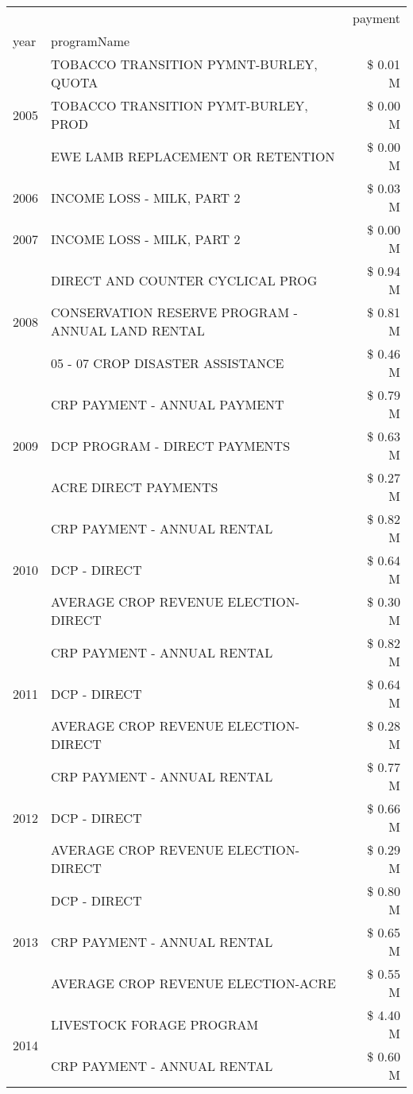 \begin{tabular}{llr}
\toprule
 &  & payment \\
year & programName &  \\
\midrule
\multirow[t]{3}{*}{2005} & TOBACCO TRANSITION PYMNT-BURLEY, QUOTA & \$ 0.01 M \\
 & TOBACCO TRANSITION PYMT-BURLEY, PROD & \$ 0.00 M \\
 & EWE LAMB REPLACEMENT OR RETENTION & \$ 0.00 M \\
\cline{1-3}
2006 & INCOME LOSS - MILK, PART 2 & \$ 0.03 M \\
\cline{1-3}
2007 & INCOME LOSS - MILK, PART 2 & \$ 0.00 M \\
\cline{1-3}
\multirow[t]{3}{*}{2008} & DIRECT AND COUNTER CYCLICAL PROG & \$ 0.94 M \\
 & CONSERVATION RESERVE PROGRAM - ANNUAL LAND RENTAL & \$ 0.81 M \\
 & 05 - 07 CROP DISASTER ASSISTANCE & \$ 0.46 M \\
\cline{1-3}
\multirow[t]{3}{*}{2009} & CRP PAYMENT - ANNUAL PAYMENT & \$ 0.79 M \\
 & DCP PROGRAM - DIRECT PAYMENTS & \$ 0.63 M \\
 & ACRE DIRECT PAYMENTS & \$ 0.27 M \\
\cline{1-3}
\multirow[t]{3}{*}{2010} & CRP PAYMENT - ANNUAL RENTAL & \$ 0.82 M \\
 & DCP - DIRECT & \$ 0.64 M \\
 & AVERAGE CROP REVENUE ELECTION-DIRECT & \$ 0.30 M \\
\cline{1-3}
\multirow[t]{3}{*}{2011} & CRP PAYMENT - ANNUAL RENTAL & \$ 0.82 M \\
 & DCP - DIRECT & \$ 0.64 M \\
 & AVERAGE CROP REVENUE ELECTION-DIRECT & \$ 0.28 M \\
\cline{1-3}
\multirow[t]{3}{*}{2012} & CRP PAYMENT - ANNUAL RENTAL & \$ 0.77 M \\
 & DCP - DIRECT & \$ 0.66 M \\
 & AVERAGE CROP REVENUE ELECTION-DIRECT & \$ 0.29 M \\
\cline{1-3}
\multirow[t]{3}{*}{2013} & DCP - DIRECT & \$ 0.80 M \\
 & CRP PAYMENT - ANNUAL RENTAL & \$ 0.65 M \\
 & AVERAGE CROP REVENUE ELECTION-ACRE & \$ 0.55 M \\
\cline{1-3}
\multirow[t]{3}{*}{2014} & LIVESTOCK FORAGE PROGRAM & \$ 4.40 M \\
 & CRP PAYMENT - ANNUAL RENTAL & \$ 0.60 M \\

\end{tabular}
